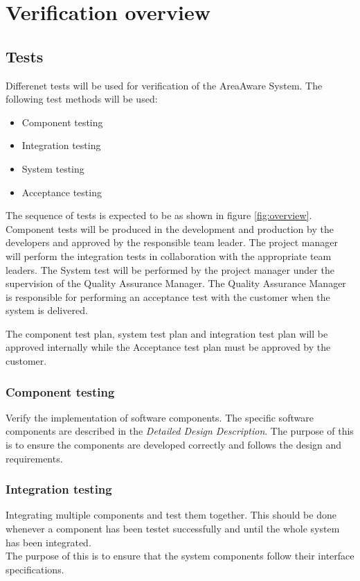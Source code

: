 \chapter{Verification overview}
\label{chp:testOverview}

\section{Tests}
Differenet tests will be used for verification of the AreaAware System. The following test methods will be used:

\begin{itemize}
	\item Component testing
	\item Integration testing
	\item System testing
	\item Acceptance testing
\end{itemize}

The sequence of tests is expected to be as shown in figure \ref{fig:overview}. Component tests will be produced in the development and production by the developers and approved by the responsible team leader. 
The project manager will perform the integration tests in collaboration with the appropriate team leaders.
The System test will be performed by the project manager under the supervision of the Quality Assurance Manager.
The Quality Assurance Manager is responsible for performing an acceptance test with the customer when the system is delivered.



The component test plan, system test plan and integration test plan will be approved internally while the Acceptance test plan must be approved by the customer. 

\subsection{Component testing}
Verify the implementation of software components. The specific software components are described in the \emph{Detailed Design Description}. The purpose of this is to ensure the components are developed correctly and follows the design and requirements. 

\subsection{Integration testing}
Integrating multiple components and test them together. This should be done whenever a component has been testet successfully and until the whole system has been integrated. \\
The purpose of this is to ensure that the system components follow their interface specifications.

